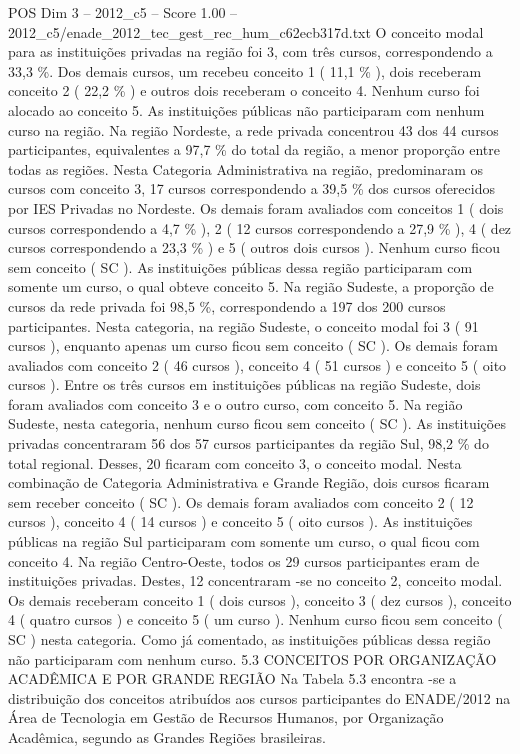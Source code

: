 \begin{textsample}{POS Dim 3 – 2012\_c5 – Score 1.00 – 2012\_c5/enade\_2012\_tec\_gest\_rec\_hum\_c62ecb317d.txt}
O conceito modal para as instituições privadas na região foi 3, com três cursos, correspondendo a 33,3 \%.
Dos demais cursos, um recebeu conceito 1 ( 11,1 \% ), dois receberam conceito 2 ( 22,2 \% ) e outros dois receberam o conceito 4.
Nenhum curso foi alocado ao conceito 5.
As instituições públicas não participaram com nenhum curso na região.
Na região Nordeste, a rede privada concentrou 43 dos 44 cursos participantes, equivalentes a 97,7 \% do total da região, a menor proporção entre todas as regiões.
Nesta Categoria Administrativa na região, predominaram os cursos com conceito 3, 17 cursos correspondendo a 39,5 \% dos cursos oferecidos por IES Privadas no Nordeste.
Os demais foram avaliados com conceitos 1 ( dois cursos correspondendo a 4,7 \% ), 2 ( 12 cursos correspondendo a 27,9 \% ), 4 ( dez cursos correspondendo a 23,3 \% ) e 5 ( outros dois cursos ).
Nenhum curso ficou sem conceito ( SC ).
As instituições públicas dessa região participaram com somente um curso, o qual obteve conceito 5.
Na região Sudeste, a proporção de cursos da rede privada foi 98,5 \%, correspondendo a 197 dos 200 cursos participantes.
Nesta categoria, na região Sudeste, o conceito modal foi 3 ( 91 cursos ), enquanto apenas um curso ficou sem conceito ( SC ).
Os demais foram avaliados com conceito 2 ( 46 cursos ), conceito 4 ( 51 cursos ) e conceito 5 ( oito cursos ).
Entre os três cursos em instituições públicas na região Sudeste, dois foram avaliados com conceito 3 e o outro curso, com conceito 5.
Na região Sudeste, nesta categoria, nenhum curso ficou sem conceito ( SC ).
As instituições privadas concentraram 56 dos 57 cursos participantes da região Sul, 98,2 \% do total regional.
Desses, 20 ficaram com conceito 3, o conceito modal.
Nesta combinação de Categoria Administrativa e Grande Região, dois cursos ficaram sem receber conceito ( SC ).
Os demais foram avaliados com conceito 2 ( 12 cursos ), conceito 4 ( 14 cursos ) e conceito 5 ( oito cursos ).
As instituições públicas na região Sul participaram com somente um curso, o qual ficou com conceito 4.
Na região Centro-Oeste, todos os 29 cursos participantes eram de instituições privadas.
Destes, 12 concentraram -se no conceito 2, conceito modal.
Os demais receberam conceito 1 ( dois cursos ), conceito 3 ( dez cursos ), conceito 4 ( quatro cursos ) e conceito 5 ( um curso ).
Nenhum curso ficou sem conceito ( SC ) nesta categoria.
Como já comentado, as instituições públicas dessa região não participaram com nenhum curso. 5.3 CONCEITOS POR ORGANIZAÇÃO ACADÊMICA E POR GRANDE REGIÃO Na Tabela 5.3 encontra -se a distribuição dos conceitos atribuídos aos cursos participantes do ENADE/2012 na Área de Tecnologia em Gestão de Recursos Humanos, por Organização Acadêmica, segundo as Grandes Regiões brasileiras.

\end{textsample}
